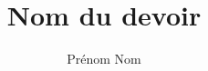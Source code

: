 \documentclass[french,nochapter,12pt]{RapportTP}
\author{
    Prénom Nom
}
\begin{document}
\title{Nom du devoir}
\subject{Sujet du devoir}
\maketitle

\section{}

\section{}

\section{}

\section{}
\end{document}
